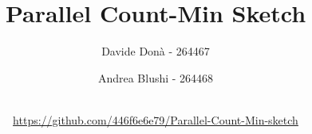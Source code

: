 \documentclass{article}
\title{Parallel Count-Min Sketch}
\author{Davide Donà - 264467 \and
 Andrea Blushi - 264468}
\date{\MonthName\ \number\year \\[0.5em]
\small\textcolor{gray}{\href{https://github.com/446f6e6e79/Parallel-Count-Min-sketch}{https://github.com/446f6e6e79/Parallel-Count-Min-sketch}}
}
\begin{document}
\maketitle
\newpage
\tableofcontents

\newpage






\nocite{*}


\end{document}
